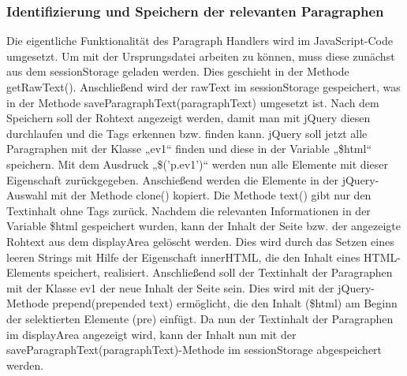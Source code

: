 {\subsubsection{Identifizierung und Speichern der relevanten Paragraphen}
Die eigentliche Funktionalität des Paragraph Handlers wird im JavaScript-Code umgesetzt. Um mit der Ursprungsdatei arbeiten zu können, muss diese zunächst aus dem sessionStorage geladen werden. Dies geschieht in der Methode getRawText(). Anschließend wird der rawText im sessionStorage gespeichert, was in der Methode saveParagraphText(paragraphText) umgesetzt ist. Nach dem Speichern soll der Rohtext angezeigt werden, damit man mit jQuery diesen durchlaufen und die Tags erkennen bzw. finden kann. jQuery soll jetzt alle Paragraphen mit der Klasse „ev1“ finden und diese in der Variable „\$html“ speichern. Mit dem Ausdruck „\$('p.ev1')“ werden nun alle Elemente mit dieser Eigenschaft zurückgegeben. Anschießend werden die Elemente in der jQuery-Auswahl mit der Methode clone() kopiert. Die Methode text() gibt nur den Textinhalt ohne Tags zurück. Nachdem die relevanten Informationen in der Variable \$html gespeichert wurden, kann der Inhalt der Seite bzw. der angezeigte Rohtext aus dem displayArea gelöscht werden. Dies wird durch das Setzen eines leeren Strings mit Hilfe der Eigenschaft innerHTML, die den Inhalt eines HTML-Elements speichert, realisiert. Anschließend soll der Textinhalt der Paragraphen mit der Klasse ev1 der neue Inhalt der Seite sein. Dies wird mit der jQuery-Methode prepend(prepended text) ermöglicht, die den Inhalt (\$html) am Beginn der selektierten Elemente (pre) einfügt. Da nun der Textinhalt der Paragraphen im displayArea angezeigt wird, kann der Inhalt nun mit der saveParagraphText(paragraphText)-Methode im sessionStorage abgespeichert werden.

}
